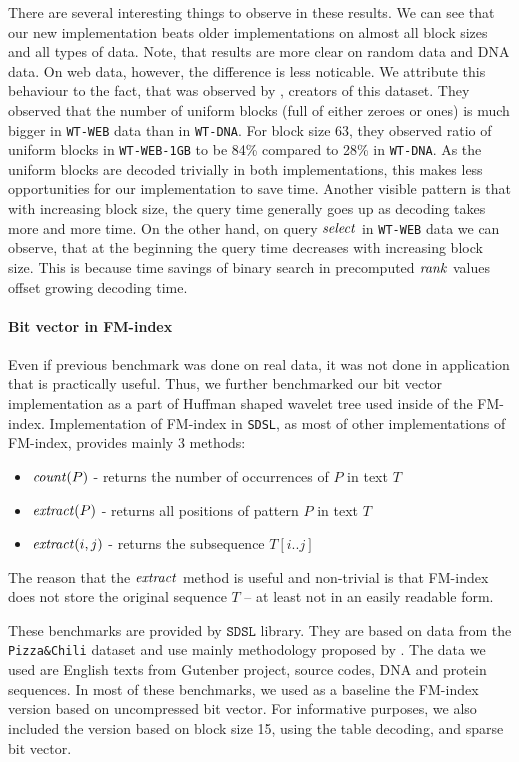 There are several interesting things to observe in these results. We can see that our new implementation
beats older implementations on almost all block sizes and all types of data. Note, that results are more
clear on random data and DNA data. On web data, however, the difference is less noticable. We attribute
this behaviour to the fact, that was observed by \cite{gog2014optimized}, creators of this dataset. They
observed that the number of uniform blocks (full of either zeroes or ones) is much bigger in \texttt{WT-WEB}
data than in \texttt{WT-DNA}. For block size 63, they observed ratio of uniform blocks in \texttt{WT-WEB-1GB}
to be 84\% compared to 28\% in \texttt{WT-DNA}. As the uniform blocks are decoded trivially in both
implementations, this makes less opportunities for our implementation to save time. Another visible pattern
is that with increasing block size, the query time generally goes up as decoding takes more and more time.
On the other hand, on query $\mathit{select}$ in \texttt{WT-WEB} data we can observe, that at the beginning the query
time decreases with increasing block size. This is because time savings of binary search in precomputed $\mathit{rank}$
values offset growing decoding time.

\paragraph{Bit vector in FM-index}

Even if previous benchmark was done on real data, it was not done in application that is
practically useful. Thus, we further benchmarked our bit vector implementation as a part
of Huffman shaped wavelet tree used inside of the FM-index. Implementation of FM-index in
\texttt{SDSL}, as most of other implementations of FM-index, provides mainly 3 methods:
\begin{itemize}
	\item $\mathit{count}(P)$ - returns the number of occurrences of $P$ in text $T$
	\item $\mathit{extract}(P)$ - returns all positions of pattern $P$ in text $T$
	\item $\mathit{extract}(i, j)$ - returns the subsequence $T[i..j]$
\end{itemize}
The reason that the $\mathit{extract}$ method is useful and non-trivial is that FM-index
does not store the original sequence $T$ -- at least not in an easily readable form.

These benchmarks are provided by $\texttt{SDSL}$ library. They are based on data from
the \texttt{Pizza\&Chili} dataset and use mainly methodology proposed by \cite{ferragina2009compressed}.
The data we used are English texts from Gutenber project, source codes, DNA and protein
sequences. In most of these benchmarks, we used as a baseline the FM-index version based
on uncompressed bit vector. For informative purposes, we also included the version based
on block size 15, using the table decoding, and sparse bit vector.

